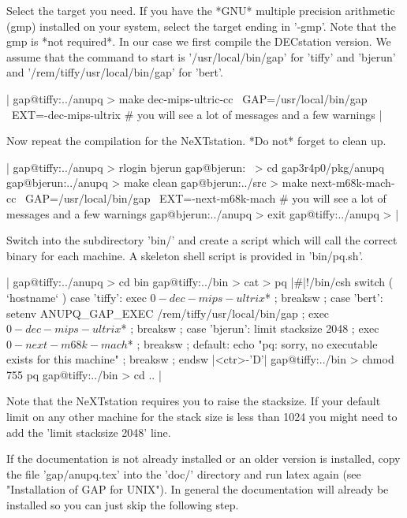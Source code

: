 Select the  target you need.  If  you  have the *GNU*  multiple precision
arithmetic (gmp)  installed on your  system, select the target  ending in
'-gmp'. Note that  the  gmp is  *not  required*.   In our  case we  first
compile   the DECstation version.   We assume  that  the command to start
{\GAP}    is  '/usr/local/bin/gap'   for   'tiffy'    and  'bjerun'   and
'/rem/tiffy/usr/local/bin/gap' for 'bert'.

|    gap@tiffy:../anupq > make dec-mips-ultric-cc \
                               GAP=/usr/local/bin/gap \
			       EXT=-dec-mips-ultrix
    # you will see a lot of messages and a few warnings |

Now repeat the compilation  for the NeXTstation. *Do not* forget to clean
up.

|    gap@tiffy:../anupq > rlogin bjerun
    gap@bjerun:~ > cd gap3r4p0/pkg/anupq
    gap@bjerun:../anupq > make clean
    gap@bjerun:../src > make next-m68k-mach-cc \
                             GAP=/usr/local/bin/gap \
			     EXT=-next-m68k-mach
    # you will see a lot of messages and a few warnings
    gap@bjerun:../anupq > exit
    gap@tiffy:../anupq > |

Switch into the subdirectory 'bin/'  and create a  script which will call
the correct binary for each machine. A skeleton  shell script is provided
in 'bin/pq.sh'.

|    gap@tiffy:../anupq > cd bin
    gap@tiffy:../bin > cat > pq
    |\#|!/bin/csh
    switch ( `hostname` )
      case 'tiffy':
        exec $0-dec-mips-ultrix $* ;
        breaksw ;
      case 'bert':
        setenv ANUPQ_GAP_EXEC /rem/tiffy/usr/local/bin/gap ;
        exec $0-dec-mips-ultrix $* ;
        breaksw ;
      case 'bjerun':
        limit stacksize 2048 ;
        exec $0-next-m68k-mach $* ;
        breaksw ;
      default:
        echo "pq: sorry, no executable exists for this machine" ;
        breaksw ;
    endsw
    |<ctr>-'D'|
    gap@tiffy:../bin > chmod 755 pq
    gap@tiffy:../bin > cd .. |

Note that the  NeXTstation requires you to raise the stacksize.   If your
default limit on any other machine for the stack size  is less than  1024
you might need to add the 'limit stacksize 2048' line.
     
If the documentation is  not  already installed  or an older  version  is
installed, copy  the file 'gap/anupq.tex' into  the  'doc/' directory and
run latex  again (see "Installation  of  GAP for  UNIX").  In general the
documentation will   already  be installed  so  you   can  just skip  the
following step.

